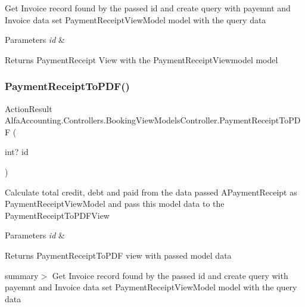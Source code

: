 Get Invoice record found by the passed id and create query with payemnt and Invoice data set Payment\+Receipt\+View\+Model model with the query data 


\begin{DoxyParams}{Parameters}
{\em id} & \\
\hline
\end{DoxyParams}
\begin{DoxyReturn}{Returns}
Payment\+Receipt View with the Payment\+Receipt\+Viewmodel model
\end{DoxyReturn}
\mbox{\label{class_alfa_accounting_1_1_controllers_1_1_booking_view_models_controller_af89a68f628793df0d1b8b3167686b33e}} 
\subsubsection{\texorpdfstring{Payment\+Receipt\+To\+P\+D\+F()}{PaymentReceiptToPDF()}}
{\footnotesize\ttfamily Action\+Result Alfa\+Accounting.\+Controllers.\+Booking\+View\+Models\+Controller.\+Payment\+Receipt\+To\+P\+DF (\begin{DoxyParamCaption}\item[{int?}]{id }\end{DoxyParamCaption})}



Calculate total credit, debt and paid from the data passed A\+Payment\+Receipt as Payment\+Receipt\+View\+Model and pass this model data to the Payment\+Receipt\+To\+P\+D\+F\+View 


\begin{DoxyParams}{Parameters}
{\em id} & \\
\hline
\end{DoxyParams}
\begin{DoxyReturn}{Returns}
Payment\+Receipt\+To\+P\+DF view with passed model data
\end{DoxyReturn}
summary$>$ Get Invoice record found by the passed id and create query with payemnt and Invoice data set Payment\+Receipt\+View\+Model model with the query data 


